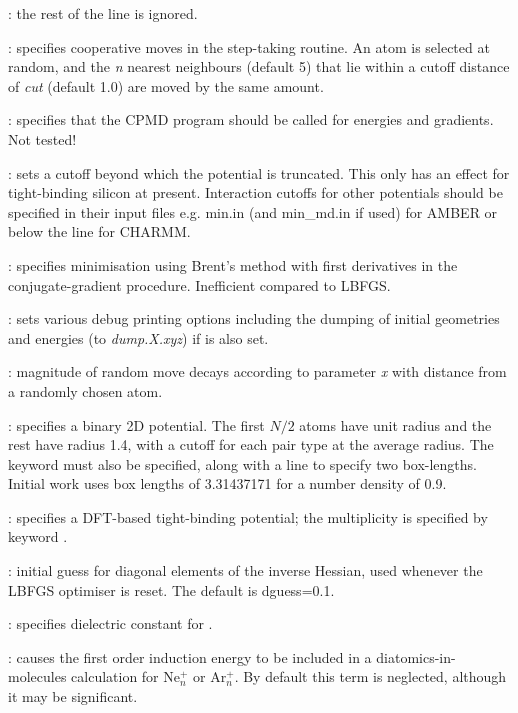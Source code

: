 : the rest of the line is ignored.

: specifies cooperative moves in the step-taking routine. An atom is
selected at random, and the {\it n} nearest neighbours (default 5) that lie within a cutoff
distance of {\it cut} (default 1.0) are moved by the same amount.

: specifies that the CPMD program should be called for energies and gradients. Not
tested!

: sets a cutoff beyond which the potential is truncated. This
only has an effect for tight-binding silicon at present. Interaction cutoffs for other potentials
should be specified in their input files e.g. {\textrm min.in} (and {\textrm min\_md.in} if used) 
for AMBER or below the {} line for CHARMM.

: specifies minimisation using Brent's method with first derivatives in the
conjugate-gradient procedure. 
Inefficient compared to LBFGS.

: sets various debug printing options including the dumping of initial
geometries and energies (to {\it dump.X.xyz\/}) if {} is also set.

: magnitude of random move decays according to parameter
{\it x\/} with distance from a randomly chosen atom.

: specifies a binary 2D potential.
The first $N/2$ atoms have unit radius and the rest
have radius 1.4, with a cutoff for each pair type at the
average radius.
The keyword {\/} must also be specified, along with a
{\/} line to specify two box-lengths.
Initial work uses box lengths of 3.31437171 for a number density of 0.9.

: specifies a DFT-based tight-binding potential; the multiplicity is specified by
keyword {\/}.

: initial guess for diagonal elements of the inverse
      Hessian, used whenever the LBFGS optimiser is reset. 
      The default is dguess=0.1.

: specifies dielectric constant for {\/}.

: causes the first order induction energy to be included
in a diatomics-in-molecules calculation for Ne$^+_n$ or Ar$^+_n$. By default this
term is neglected, although it may be significant.

